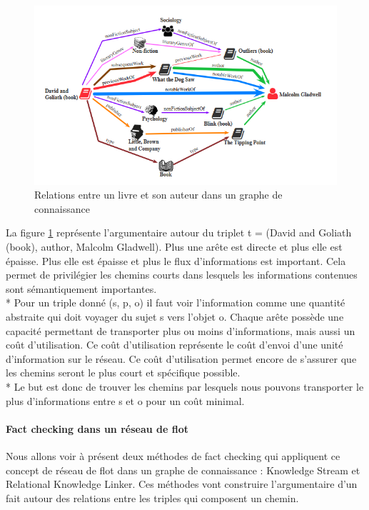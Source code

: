 \begin{figure}[H]
\centering
\includegraphics[width=\textwidth, draft=false]{imgs/bookAuthorKG.PNG}
\caption{Relations entre un livre et son auteur dans un graphe de connaissance \cite{shiralkar2017finding}}
\label{stream}
\end{figure}

La figure \ref{stream} représente l'argumentaire autour du triplet t = (David and Goliath (book), author, Malcolm Gladwell). Plus une arête est directe et plus elle est épaisse. Plus elle est épaisse et plus le flux d'informations est important. Cela permet de privilégier les chemins courts dans lesquels les informations contenues sont sémantiquement importantes. 
\\*
Pour un triple donné (s, p, o) il faut voir l'information comme une quantité abstraite qui doit voyager du sujet s vers l'objet o. Chaque arête possède une capacité permettant de transporter plus ou moins d'informations, mais aussi un coût d'utilisation. Ce coût d'utilisation représente le coût d'envoi d'une unité d'information sur le réseau. Ce coût d'utilisation permet encore de s'assurer que les chemins seront le plus court et spécifique possible.
\\*
Le but est donc de trouver les chemins par lesquels nous pouvons transporter le plus d'informations entre s et o pour un coût minimal.

\paragraph{Fact checking dans un réseau de flot}

Nous allons voir à présent deux méthodes de fact checking qui appliquent ce concept de réseau de flot dans un graphe de connaissance : Knowledge Stream et Relational Knowledge Linker. Ces méthodes vont construire l'argumentaire d'un fait autour des relations entre les triples qui composent un chemin.

